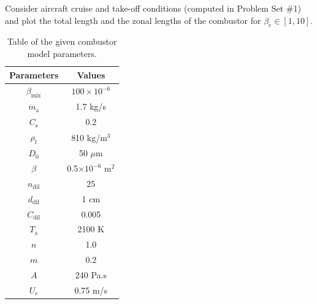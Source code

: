 \documentclass[11pt]{article}
\begin{document}
Consider aircraft cruise and take-off conditions (computed in Problem Set \#1) and plot the total length and the zonal lengths of the combustor for $\beta_\mathrm{c}\in[1,10]$.

         \begin{table}[!htb!]
        	\centering
        	\begin{tabular}{|c|c|}\hline
        Parameters & Values \\
        \hline
        $\beta_\mathrm{mix}$ & $100\times 10^{-6}$ \\
        $\dot{m}_\mathrm{a}$ & 1.7 kg/s \\
        $C_\mathrm{s}$ & 0.2  \\
        $\rho_\mathrm{f}$ & 810 kg/m$^3$  \\
        $D_0$ & 50 $\mu$m  \\
        $\beta$ &  0.5$\times 10^{-6}$ m$^2$  \\
        $n_\mathrm{dil}$ &  25 \\
        $d_\mathrm{dil}$ &  1 cm \\
        $C_\mathrm{dil}$ &  0.005 \\
        $T_\mathrm{a}$ &  2100 K \\
        $n$ &  1.0 \\
        $m$ &  0.2 \\
        $A$ &  240 Pa.s \\
        $U_e$ & 0.75 m/s \\
        \hline
        \end{tabular}
          \caption{\label{TAB_PARAMS} Table of the given combustor model parameters.}
          \end{table}



\end{document}
